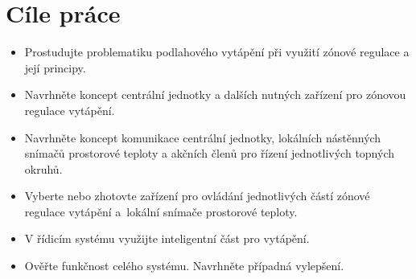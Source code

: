 \section{Cíle práce}
\begin{itemize}
\item Prostudujte problematiku podlahového vytápění při využití zónové regulace a její principy.
\item Navrhněte koncept centrální jednotky a dalších nutných zařízení pro zónovou regulace vytápění.
\item Navrhněte koncept komunikace centrální jednotky, lokálních nástěnných snímačů prostorové teploty a akčních členů pro řízení jednotlivých topných okruhů.
\item Vyberte nebo zhotovte zařízení pro ovládání jednotlivých částí zónové regulace vytápění a~lokální snímače prostorové teploty.
\item V řídicím systému využijte inteligentní část pro vytápění.
\item Ověřte funkčnost celého systému. Navrhněte případná vylepšení.

\end{itemize}